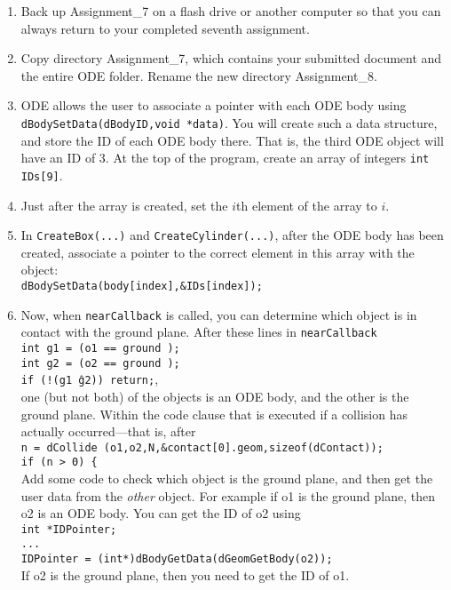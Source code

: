 \documentclass[12pt]{article}
\begin{document}
\begin{enumerate}

\item Back up Assignment\_7 on a flash drive or another computer so that you can always return to your completed seventh assignment.

\item Copy directory Assignment\_7, which contains your submitted document and the entire ODE folder. Rename the new directory Assignment\_8.

\item ODE allows the user to associate a pointer with each ODE body using \\ \texttt{dBodySetData(dBodyID,void *data)}. You will create such a data structure, and store the ID of each ODE body there. That is, the third ODE object will have an ID of 3. At the top of the program, create an array of integers \texttt{int IDs[9]}.

\item Just after the array is created, set the $i$th element of the array to $i$.

\item In \texttt{CreateBox(...)} and \texttt{CreateCylinder(...)}, after the ODE body has been created, associate a pointer to the correct element in this array with the object: \\
    \texttt{dBodySetData(body[index],\&IDs[index]);}

\item Now, when \texttt{nearCallback} is called, you can determine which object is in contact with the ground plane. After these lines in \texttt{nearCallback} \\
    \texttt{int g1 = (o1 == ground );} \\
    \texttt{int g2 = (o2 == ground );} \\
    \texttt{if (!(g1 \^ g2)) return;}, \\
    one (but not both) of the objects is an ODE body, and the other is the ground plane.
    Within the code clause that is executed if a collision has actually occurred---that is, after \\
    \texttt{n = dCollide (o1,o2,N,\&contact[0].geom,sizeof(dContact));}\\
    \texttt{if (n > 0) \{}\\
    Add some code to check which object is the ground plane, and then get the user data from the \textit{other} object. For example if o1 is the ground plane, then o2 is an ODE body. You can get the ID of o2 using \\
    \texttt{int *IDPointer;}\\
    \texttt{...}\\
    \texttt{IDPointer = (int*)dBodyGetData(dGeomGetBody(o2));}\\
    If o2 is the ground plane, then you need to get the ID of o1.


\end{enumerate}
\end{document}
